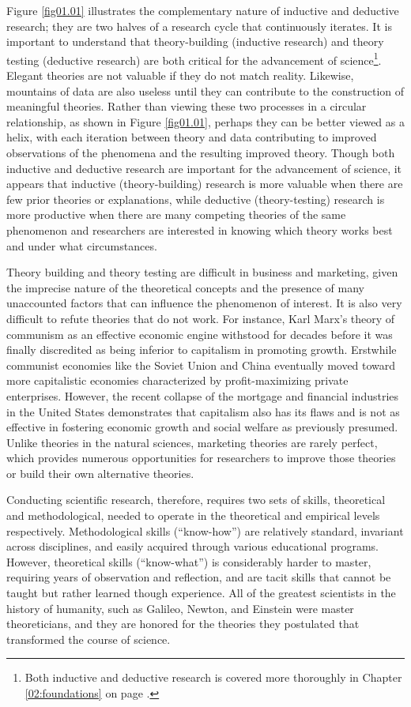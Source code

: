 Figure \ref{fig01.01} illustrates the complementary nature of inductive and deductive research; they are two halves of a research cycle that continuously iterates. It is important to understand that theory-building (inductive research) and theory testing (deductive research) are both critical for the advancement of science\footnote{Both inductive and deductive research is covered more thoroughly in Chapter \ref{02:foundations} on page \pageref{02:foundations}.}. Elegant theories are not valuable if they do not match reality. Likewise, mountains of data are also useless until they can contribute to the construction of meaningful theories. Rather than viewing these two processes in a circular relationship, as shown in Figure \ref{fig01.01}, perhaps they can be better viewed as a helix, with each iteration between theory and data contributing to improved observations of the phenomena and the resulting improved theory. Though both inductive and deductive research are important for the advancement of science, it appears that inductive (theory-building) research is more valuable when there are few prior theories or explanations, while deductive (theory-testing) research is more productive when there are many competing theories of the same phenomenon and researchers are interested in knowing which theory works best and under what circumstances.

Theory building and theory testing are difficult in business and marketing, given the imprecise nature of the theoretical concepts and the presence of many unaccounted factors that can influence the phenomenon of interest. It is also very difficult to refute theories that do not work. For instance, Karl Marx's theory of communism as an effective economic engine withstood for decades before it was finally discredited as being inferior to capitalism in promoting growth. Erstwhile communist economies like the Soviet Union and China eventually moved toward more capitalistic economies characterized by profit-maximizing private enterprises. However, the recent collapse of the mortgage and financial industries in the United States demonstrates that capitalism also has its flaws and is not as effective in fostering economic growth and social welfare as previously presumed. Unlike theories in the natural sciences, marketing theories are rarely perfect, which provides numerous opportunities for researchers to improve those theories or build their own alternative theories.

Conducting scientific research, therefore, requires two sets of skills, theoretical and methodological, needed to operate in the theoretical and empirical levels respectively. Methodological skills (``know-how'') are relatively standard, invariant across disciplines, and easily acquired through various educational programs. However, theoretical skills (``know-what'') is considerably harder to master, requiring years of observation and reflection, and are tacit skills that cannot be taught but rather learned though experience. All of the greatest scientists in the history of humanity, such as Galileo, Newton, and Einstein were master theoreticians, and they are honored for the theories they postulated that transformed the course of science.

